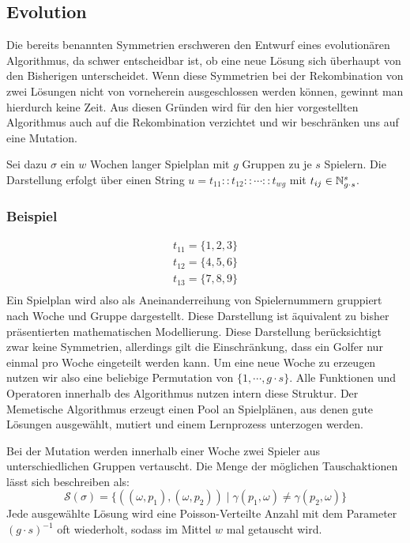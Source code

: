 \subsection{Evolution}
Die bereits benannten Symmetrien erschweren den Entwurf eines evolutionären Algorithmus, da schwer entscheidbar ist, ob eine neue Lösung sich überhaupt von den Bisherigen unterscheidet.
Wenn diese Symmetrien bei der Rekombination von zwei Lösungen nicht von vorneherein ausgeschlossen werden können, gewinnt man hierdurch keine Zeit. Aus diesen Gründen wird für den hier vorgestellten Algorithmus auch auf die Rekombination verzichtet und wir beschränken uns auf eine Mutation. 

Sei dazu $\sigma$ ein $w$ Wochen langer Spielplan mit $g$ Gruppen zu je $s$ Spielern. Die Darstellung erfolgt über einen String $u = t_{11} :: t_{12} :: \cdots :: t_{wg}$ mit $t_{ij} \in \mathbb{N}_{g \cdot s}^s$.

\subsubsection{Beispiel}
\begin{equation}
\begin{split} 
  t_{11} = \{ 1, 2, 3\} \\
  t_{12} = \{ 4, 5, 6\} \\
  t_{13} = \{ 7, 8, 9\} \\
\end{split}
\end{equation}
Ein Spielplan wird also als Aneinanderreihung von Spielernummern gruppiert nach Woche und Gruppe dargestellt. Diese Darstellung ist äquivalent zu bisher präsentierten mathematischen Modellierung.
Diese Darstellung berücksichtigt zwar keine Symmetrien, allerdings gilt die Einschränkung, dass ein Golfer nur einmal pro Woche eingeteilt werden kann. 
Um eine neue Woche zu erzeugen nutzen wir also eine beliebige Permutation von $\{ 1, \cdots, g \cdot s\}$. Alle Funktionen und Operatoren innerhalb des Algorithmus nutzen intern diese Struktur. 
Der Memetische Algorithmus erzeugt einen Pool an Spielplänen, aus denen gute Lösungen ausgewählt, mutiert und einem Lernprozess unterzogen werden.

Bei der Mutation werden innerhalb einer Woche zwei Spieler aus unterschiedlichen Gruppen vertauscht. Die Menge der möglichen Tauschaktionen lässt sich beschreiben als:
\begin{equation}
  \mathcal{S}(\sigma) = \{ ((\omega, p_1), (\omega, p_2)) \;|\; \gamma(p_1, \omega) \neq \gamma(p_2, \omega) \}
\end{equation}
Jede ausgewählte Lösung wird eine Poisson-Verteilte Anzahl mit dem Parameter $(g \cdot s)^{-1}$ oft wiederholt, sodass im Mittel $w$ mal getauscht wird.



